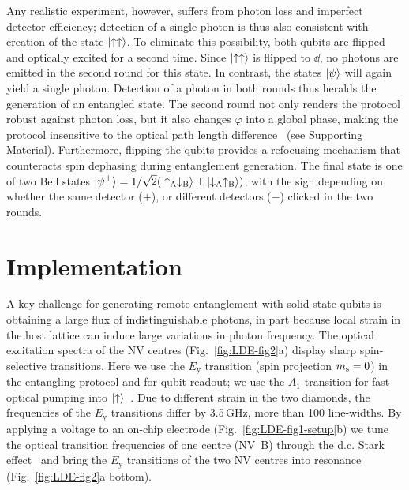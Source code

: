 Any realistic experiment, however, suffers from photon loss and imperfect detector efficiency; detection of a single photon is thus also consistent with creation of the state $\left|\uparrow\uparrow\right\rangle$. To eliminate this possibility, both qubits are flipped and optically excited for a second time. Since $\left|\uparrow\uparrow\right\rangle$ is flipped to $\dd$, no photons are emitted in the second round for this state. In contrast, the states $\left|\psi\right\rangle$ will again yield a single photon. Detection of a photon in both rounds thus heralds the generation of an entangled state. The second round not only renders the protocol robust against photon loss, but it also changes $\varphi$ into a global phase, making the protocol insensitive to the optical path length difference~\cite{Barrett2005} (see Supporting Material). Furthermore, flipping the qubits provides a refocusing mechanism that counteracts spin dephasing during entanglement generation. The final state is one of two Bell states $\left|\psi^\pm\right\rangle=1/\sqrt{2}(\left|\uparrow_\text{A}\downarrow_\text{B}\right\rangle\pm\left|\downarrow_\text{A}\uparrow_\text{B}\right\rangle)$, with the sign depending on whether the same detector ($+$), or different detectors ($-$) clicked in the two rounds.

\section{Implementation}

A key challenge for generating remote entanglement with solid-state qubits is obtaining a large flux of indistinguishable photons, in part because local strain in the host lattice can induce large variations in photon frequency. The optical excitation spectra of the NV centres (Fig.~\ref{fig:LDE-fig2}a) display sharp spin-selective transitions. Here we use the $E_\text{y}$ transition (spin projection $m_\mathrm s = 0$) in the entangling protocol and for qubit readout; we use the $A_1$ transition for fast optical pumping into $\left|\uparrow\right\rangle$~\cite{Robledo2011}. Due to different strain in the two diamonds, the frequencies of the $E_\text{y}$ transitions differ by 3.5$\,$GHz, more than 100 line-widths. By applying a voltage to an on-chip electrode (Fig.~\ref{fig:LDE-fig1-setup}b) we tune the optical transition frequencies of one centre (NV~B) through the d.c. Stark effect~\cite{Bernien2012a,Bassett2011a} and bring the $E_\text{y}$ transitions of the two NV centres into resonance (Fig.~\ref{fig:LDE-fig2}a bottom).

